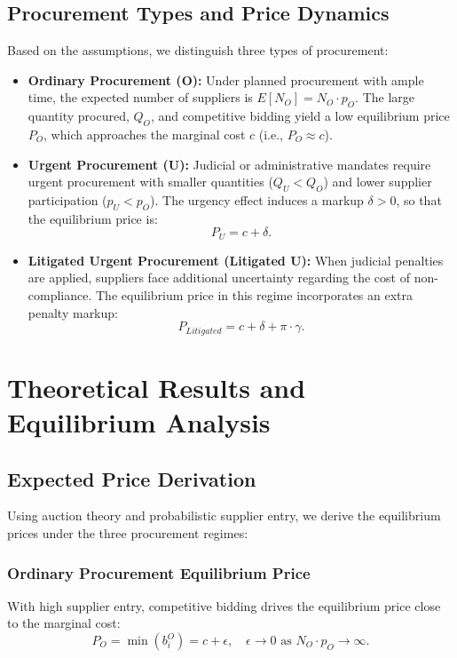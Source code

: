 \subsection{Procurement Types and Price Dynamics}
Based on the assumptions, we distinguish three types of procurement:
\begin{itemize}
    \item \textbf{Ordinary Procurement (O):} Under planned procurement with ample time, the expected number of suppliers is \(E[N_O] = N_O \cdot p_O\). The large quantity procured, \(Q_O\), and competitive bidding yield a low equilibrium price \(P_O\), which approaches the marginal cost \(c\) (i.e., \(P_O \approx c\)).
    
    \item \textbf{Urgent Procurement (U):} Judicial or administrative mandates require urgent procurement with smaller quantities (\(Q_U < Q_O\)) and lower supplier participation (\(p_U < p_O\)). The urgency effect induces a markup \(\delta > 0\), so that the equilibrium price is:
    \[
    P_U = c + \delta.
    \]
    
    \item \textbf{Litigated Urgent Procurement (Litigated U):} When judicial penalties are applied, suppliers face additional uncertainty regarding the cost of non-compliance. The equilibrium price in this regime incorporates an extra penalty markup:
    \[
    P_{Litigated} = c + \delta + \pi \cdot \gamma.
    \]
\end{itemize}

\section{Theoretical Results and Equilibrium Analysis}

\subsection{Expected Price Derivation}
Using auction theory and probabilistic supplier entry, we derive the equilibrium prices under the three procurement regimes:

\subsubsection{Ordinary Procurement Equilibrium Price}
With high supplier entry, competitive bidding drives the equilibrium price close to the marginal cost:
\[
P_O = \min(b_i^{O}) = c + \epsilon, \quad \epsilon \to 0 \text{ as } N_O \cdot p_O \to \infty.
\]

